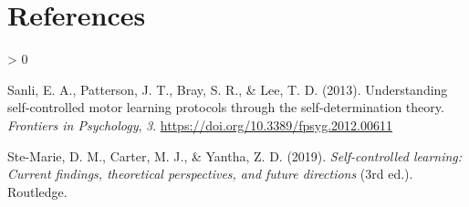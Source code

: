 \documentclass[
  english,
  jou]{apa7}
\newlength{\cslhangindent}
\newenvironment{CSLReferences}[2] %
 {%
  \setlength{\parindent}{0pt}
  \ifodd #1 \everypar{\setlength{\hangindent}{\cslhangindent}}\ignorespaces\fi
  \ifnum #2 > 0
  \setlength{\parskip}{#2\baselineskip}
  \fi
 }%
 {}
\begin{document}
\newpage

\hypertarget{references}{%
\section{References}\label{references}}

\begingroup
\setlength{\parindent}{-0.5in}
\setlength{\leftskip}{0.5in}

\endgroup

\hypertarget{refs}{}
\begin{CSLReferences}{1}{0}
\leavevmode\hypertarget{ref-sanli2013}{}%
Sanli, E. A., Patterson, J. T., Bray, S. R., \& Lee, T. D. (2013). Understanding self-controlled motor learning protocols through the self-determination theory. \emph{Frontiers in Psychology}, \emph{3}. \url{https://doi.org/10.3389/fpsyg.2012.00611}

\leavevmode\hypertarget{ref-ste-marie2019}{}%
Ste-Marie, D. M., Carter, M. J., \& Yantha, Z. D. (2019). \emph{Self-controlled learning: Current findings, theoretical perspectives, and future directions} (3rd ed.). Routledge.

\end{CSLReferences}
\end{document}
